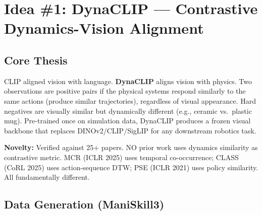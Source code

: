 \documentclass[11pt,a4paper]{article}
\begin{document}
\newpage
\section{Idea \#1: DynaCLIP --- Contrastive Dynamics-Vision Alignment}
\label{sec:dynaclip}

\subsection{Core Thesis}

CLIP aligned vision with language. \textbf{DynaCLIP} aligns vision with physics. Two observations are positive pairs if the physical systems respond similarly to the same actions (produce similar trajectories), regardless of visual appearance. Hard negatives are visually similar but dynamically different (e.g., ceramic vs.\ plastic mug). Pre-trained once on simulation data, DynaCLIP produces a frozen visual backbone that replaces DINOv2/CLIP/SigLIP for any downstream robotics task.

\textbf{Novelty:} Verified against 25+ papers. NO prior work uses dynamics similarity as contrastive metric. MCR (ICLR 2025) uses temporal co-occurrence; CLASS (CoRL 2025) uses action-sequence DTW; PSE (ICLR 2021) uses policy similarity. All fundamentally different.

\subsection{Data Generation (ManiSkill3)}
\end{document}
